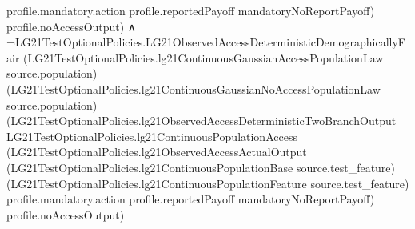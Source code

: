 \documentclass[10pt]{article}
\begin{document}
\begin{ReviewVerbatim}
                        profile.mandatory.action profile.reportedPayoff mandatoryNoReportPayoff)
                      profile.noAccessOutput) ∧
                ¬LG21TestOptionalPolicies.LG21ObservedAccessDeterministicDemographicallyFair
                    (LG21TestOptionalPolicies.lg21ContinuousGaussianAccessPopulationLaw source.population)
                    (LG21TestOptionalPolicies.lg21ContinuousGaussianNoAccessPopulationLaw source.population)
                    (LG21TestOptionalPolicies.lg21ObservedAccessDeterministicTwoBranchOutput
                      LG21TestOptionalPolicies.lg21ContinuousPopulationAccess
                      (LG21TestOptionalPolicies.lg21ObservedAccessActualOutput
                        (LG21TestOptionalPolicies.lg21ContinuousPopulationBase source.test_feature)
                        (LG21TestOptionalPolicies.lg21ContinuousPopulationFeature source.test_feature)
                        profile.mandatory.action profile.reportedPayoff mandatoryNoReportPayoff)
                      profile.noAccessOutput)
\end{ReviewVerbatim}
\end{document}

